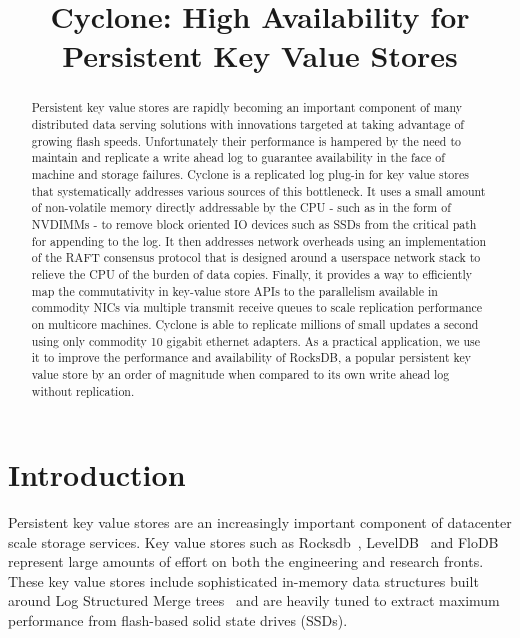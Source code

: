 \documentclass[pageno]{jpaper}
\begin{document}
\title{\Large \bf Cyclone: High Availability for Persistent Key Value Stores}


\date{}
\maketitle

\thispagestyle{empty}

\begin{abstract}
\vspace{0.1in}
Persistent key value stores are rapidly becoming an important component of many
distributed data serving solutions with innovations targeted at taking advantage
of growing flash speeds. Unfortunately their performance is hampered by the need
to maintain and replicate a write ahead log to guarantee availability in the
face of machine and storage failures. Cyclone is a replicated log plug-in for
key value stores that systematically addresses various sources of this
bottleneck. It uses a small amount of non-volatile memory directly addressable
by the CPU - such as in the form of NVDIMMs - to remove block oriented IO
devices such as SSDs from the critical path for appending to the log. It then
addresses network overheads using an implementation of the RAFT consensus
protocol that is designed around a userspace network stack to relieve the CPU of
the burden of data copies. Finally, it provides a way to efficiently map the
commutativity in key-value store APIs to the parallelism available in commodity
NICs via multiple transmit receive queues to scale replication performance on
multicore machines. Cyclone is able to replicate millions of small updates a
second using only commodity 10 gigabit ethernet adapters. As a practical
application, we use it to improve the performance and availability of RocksDB, a
popular persistent key value store by an order of magnitude when compared to its
own write ahead log without replication.
\end{abstract}

\section{Introduction}
Persistent key value stores are an increasingly important component of
datacenter scale storage services. Key value stores such as
Rocksdb~\cite{rocksdb}, LevelDB~\cite{leveldb} and FloDB~\cite{flodb} represent
large amounts of effort on both the engineering and research fronts. These key
value stores include sophisticated in-memory data structures built around Log
Structured Merge trees~\cite{lsmtree} and are heavily tuned to extract maximum
performance from flash-based solid state drives (SSDs).
\end{document}
